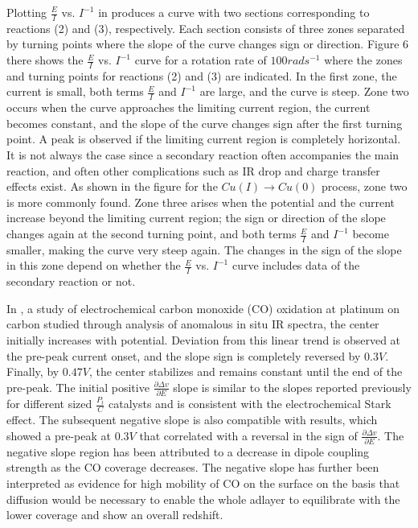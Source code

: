 \documentclass[11pt]{book}
\begin{document}
Plotting $\frac{E}{I}$ vs. $I^{-1}$ in \cite{ponce2007strategies}
produces a curve with two sections corresponding to reactions (2)
and (3), respectively. Each section consists of three zones separated
by turning points where the slope of the curve changes sign or direction.
Figure 6 there shows the $\frac{E}{I}$ vs. $I^{-1}$ curve for a
rotation rate of $100rads^{-1}$ where the zones and turning points
for reactions (2) and (3) are indicated. In the first zone, the current
is small, both terms $\frac{E}{I}$ and $I^{-1}$ are large, and the
curve is steep. Zone two occurs when the curve approaches the limiting
current region, the current becomes constant, and the slope of the
curve changes sign after the first turning point. A peak is observed
if the limiting current region is completely horizontal. It is not
always the case since a secondary reaction often accompanies the main
reaction, and often other complications such as IR drop and charge
transfer effects exist. As shown in the figure for the $Cu\left(I\right)\rightarrow Cu\left(0\right)$
process, zone two is more commonly found. Zone three arises when the
potential and the current increase beyond the limiting current region;
the sign or direction of the slope changes again at the second turning
point, and both terms $\frac{E}{I}$ and $I^{-1}$ become smaller,
making the curve very steep again. The changes in the sign of the
slope in this zone depend on whether the $\frac{E}{I}$ vs. $I^{-1}$
curve includes data of the secondary reaction or not.

In \cite{mcpherson2017electrochemical}, a study of electrochemical carbon monoxide (CO) oxidation at platinum on carbon studied
through analysis of anomalous in situ IR spectra, the center initially increases
with potential. Deviation from this linear trend is observed at the
pre-peak current onset, and the slope sign is completely reversed
by $0.3V$. Finally, by $0.47V$, the center stabilizes and remains
constant until the end of the pre-peak. The initial positive $\frac{\partial\Delta v}{\partial E}$
slope is similar to the slopes reported previously for different sized
$\frac{P_{t}}{C}$ catalysts and is consistent with the electrochemical
Stark effect. The subsequent negative slope is also compatible with
results, which showed a pre-peak at $0.3V$ that correlated with a
reversal in the sign of $\frac{\partial\Delta v}{\partial E}$. The
negative slope region has been attributed to a decrease in dipole
coupling strength as the CO coverage decreases. The negative slope
has further been interpreted as evidence for high mobility of CO on
the surface on the basis that diffusion would be necessary to enable
the whole adlayer to equilibrate with the lower coverage and show
an overall redshift.
\end{document}
